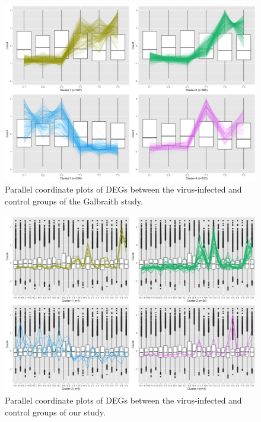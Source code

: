 \documentclass[11pt,a4paper,oldfontcommands,openany]{memoir}
\numberwithin{equation}{section} %
\begin{document}
\begin{figure}[H]
\centering
  \includegraphics[width=\textwidth]{../VirusHoneyBee/DESeq2/ClusterStandard/Clustering_data_FDR_05/C_T_4.jpg}
  \caption{Parallel coordinate plots of DEGs between the virus-infected and control groups of the Galbraith study.}
  \label{fig:pcpGalbraith}
\end{figure}

\begin{figure}[H]
\centering
  \includegraphics[width=\textwidth]{../N_V/DESeq2/ClusterStandard/Clustering_data_FDR_05/N_V_4.jpg}
  \caption{Parallel coordinate plots of DEGs between the virus-infected and control groups of our study.}
  \label{fig:pcpRutterVirus}
\end{figure}
\end{document}
